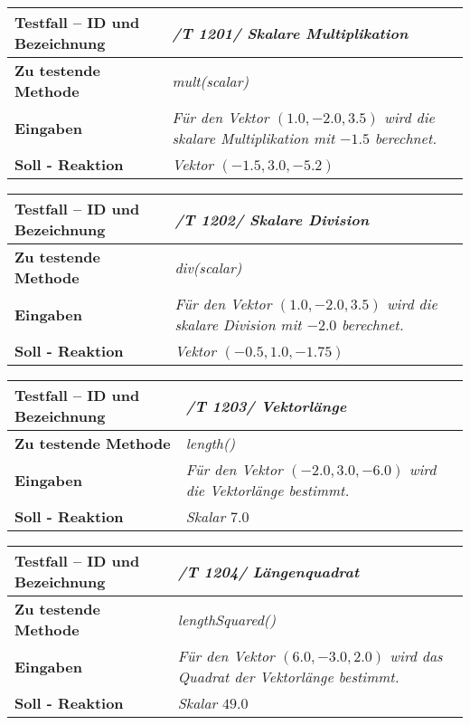 \begin{longtable}{|p{7cm}|p{10cm}|}
\hline
\textbf{Testfall -- ID und Bezeichnung} & \textit{/T 1201/ Skalare Multiplikation} \\
\hline
\textbf{Zu testende Methode} &  \textit{mult(scalar)} \\
\hline
\textbf{Eingaben} & \textit{Für den Vektor $(1.0, -2.0, 3.5)$ wird die skalare
Multiplikation mit $-1.5$ berechnet.}\\
\hline
\textbf{Soll - Reaktion} & \textit{Vektor  $(-1.5, 3.0, -5.2)$} \\
\hline
\end{longtable}

\begin{longtable}{|p{7cm}|p{10cm}|}
\hline
\textbf{Testfall -- ID und Bezeichnung} & \textit{ /T 1202/ Skalare Division} \\
\hline
\textbf{Zu testende Methode} &  \textit{div(scalar)} \\
\hline
\textbf{Eingaben} & \textit{Für den Vektor $(1.0, -2.0, 3.5)$ wird die skalare
Division mit $-2.0$ berechnet.}\\
\hline
\textbf{Soll - Reaktion} & \textit{Vektor  $(-0.5, 1.0, -1.75)$} \\
\hline
\end{longtable}


\begin{longtable}{|p{7cm}|p{10cm}|}
\hline
\textbf{Testfall -- ID und Bezeichnung} & \textit{ /T 1203/ Vektorlänge} \\
\hline
\textbf{Zu testende Methode} &  \textit{length()} \\
\hline
\textbf{Eingaben} & \textit{Für den Vektor $(-2.0, 3.0, -6.0)$ wird die Vektorlänge 
bestimmt.}\\
\hline
\textbf{Soll - Reaktion} & \textit{Skalar $7.0$} \\
\hline
\end{longtable}


\begin{longtable}{|p{7cm}|p{10cm}|}
\hline
\textbf{Testfall -- ID und Bezeichnung} & \textit{ /T 1204/ Längenquadrat} \\
\hline
\textbf{Zu testende Methode} &  \textit{lengthSquared()} \\
\hline
\textbf{Eingaben} & \textit{Für den Vektor $(6.0, -3.0, 2.0)$ wird das Quadrat der
Vektorlänge bestimmt.}\\
\hline
\textbf{Soll - Reaktion} & \textit{Skalar $49.0$} \\
\hline
\end{longtable}

